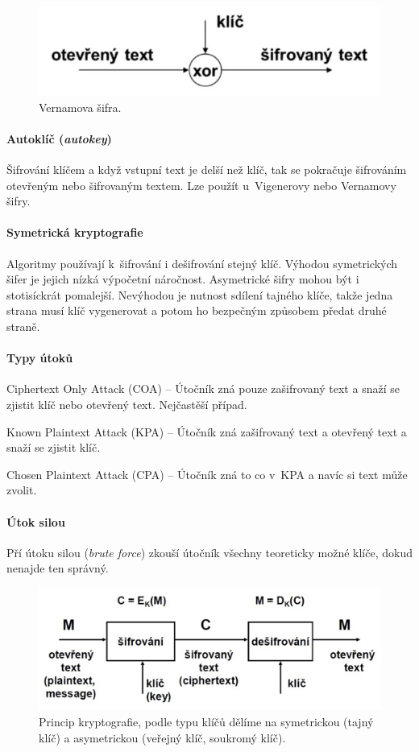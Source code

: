 \begin{figure}[H]
    \centering
    \includegraphics[width=0.5\linewidth]{vernam.png}
    \caption{Vernamova šifra.}
\end{figure}

\paragraph*{Autoklíč (\textit{autokey})} Šifrování klíčem a když vstupní text je delší než klíč, tak se pokračuje šifrováním otevřeným nebo šifrovaným textem. Lze použít u~Vigenerovy nebo Vernamovy šifry.

\paragraph*{Symetrická kryptografie} Algoritmy používají k~šifrování i dešifrování stejný klíč. Výhodou symetrických šifer je jejich nízká výpočetní náročnost. Asymetrické šifry mohou být i stotisíckrát pomalejší. Nevýhodou je nutnost sdílení tajného klíče, takže jedna strana musí klíč vygenerovat a potom ho bezpečným způsobem předat druhé straně.

\paragraph*{Typy útoků} \begin{compactitem}
    \item Ciphertext Only Attack (COA) -- Útočník zná pouze zašifrovaný text a snaží se zjistit klíč nebo otevřený text. Nejčastěší případ.
    \item Known Plaintext Attack (KPA) -- Útočník zná zašifrovaný text a otevřený text a snaží se zjistit klíč.
    \item Chosen Plaintext Attack (CPA) -- Útočník zná to co v~KPA a navíc si text může zvolit.
\end{compactitem}

\paragraph*{Útok silou} Pří útoku silou (\textit{brute force}) zkouší útočník všechny teoreticky možné klíče, dokud nenajde ten správný.

\begin{figure}[H]
    \centering
    \includegraphics[width=0.75\linewidth]{kryptografie.png}
    \caption{Princip kryptografie, podle typu klíčů dělíme na symetrickou (tajný klíč) a asymetrickou (veřejný klíč, soukromý klíč).}
\end{figure}

